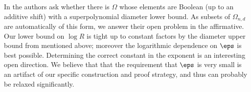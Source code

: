 In \cite[Section 2.1]{straszak2017computing} the authors ask whether there is $\Omega$ whose elements are Boolean (up to an additive shift) with a superpolynomial diameter lower bound. As subsets of $\Omega_{n,d}$ are automatically of this form, we answer their open problem in the affirmative. Our lower bound on $\log R$ is tight up to constant factors by the diameter upper bound from \cite{straszak2017computing} mentioned above; moreover the logarithmic dependence on $\eps$ is best possible. Determining the correct constant in the exponent is an interesting open direction. We believe that that the requirement that $\eps$ is very small is an artifact of our specific construction and proof strategy, and thus can probably be relaxed significantly.






















































































